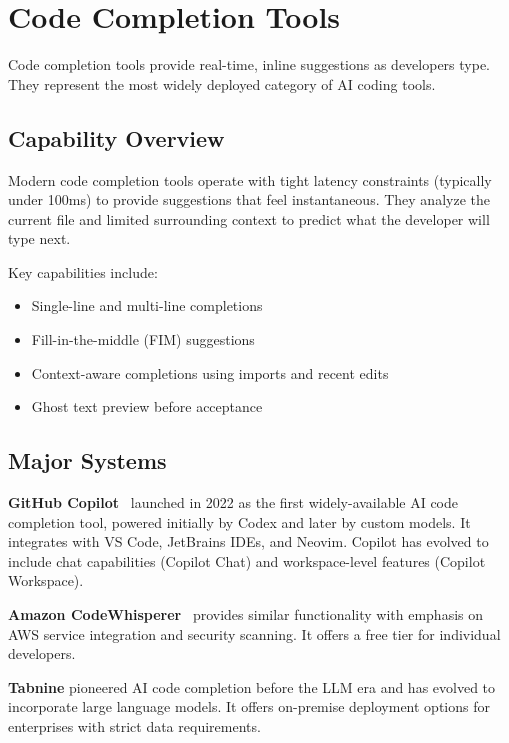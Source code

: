 \section{Code Completion Tools}
\label{sec:completion}

Code completion tools provide real-time, inline suggestions as developers type. They represent the most widely deployed category of AI coding tools.

\subsection{Capability Overview}

Modern code completion tools operate with tight latency constraints (typically under 100ms) to provide suggestions that feel instantaneous. They analyze the current file and limited surrounding context to predict what the developer will type next.

Key capabilities include:
\begin{itemize}
    \item Single-line and multi-line completions
    \item Fill-in-the-middle (FIM) suggestions
    \item Context-aware completions using imports and recent edits
    \item Ghost text preview before acceptance
\end{itemize}

\subsection{Major Systems}

\textbf{GitHub Copilot}~\citep{github2022copilot} launched in 2022 as the first widely-available AI code completion tool, powered initially by Codex and later by custom models. It integrates with VS Code, JetBrains IDEs, and Neovim. Copilot has evolved to include chat capabilities (Copilot Chat) and workspace-level features (Copilot Workspace).

\textbf{Amazon CodeWhisperer}~\citep{aws2023codewhisperer} provides similar functionality with emphasis on AWS service integration and security scanning. It offers a free tier for individual developers.

\textbf{Tabnine} pioneered AI code completion before the LLM era and has evolved to incorporate large language models. It offers on-premise deployment options for enterprises with strict data requirements.

